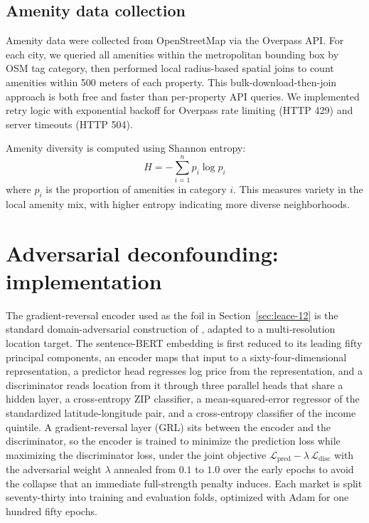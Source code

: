 \documentclass{article}
\begin{document}
\subsection{Amenity data collection}

Amenity data were collected from OpenStreetMap via the Overpass API. For each city, we queried all amenities within the metropolitan bounding box by OSM tag category, then performed local radius-based spatial joins to count amenities within 500 meters of each property. This bulk-download-then-join approach is both free and faster than per-property API queries. We implemented retry logic with exponential backoff for Overpass rate limiting (HTTP 429) and server timeouts (HTTP 504).

Amenity diversity is computed using Shannon entropy:
\begin{equation}
H = -\sum_{i=1}^n p_i \log p_i
\end{equation}
where $p_i$ is the proportion of amenities in category $i$. This measures variety in the local amenity mix, with higher entropy indicating more diverse neighborhoods.

\section{Adversarial deconfounding: implementation}
\label{app:adversarial}

The gradient-reversal encoder used as the foil in Section~\ref{sec:leace-12} is the
standard domain-adversarial construction of \citet{ganin2016domain}, adapted to a
multi-resolution location target. The sentence-BERT embedding is first reduced to
its leading fifty principal components, an encoder maps that input to a
sixty-four-dimensional representation, a predictor head regresses log price from
the representation, and a discriminator reads location from it through three
parallel heads that share a hidden layer, a cross-entropy ZIP classifier, a
mean-squared-error regressor of the standardized latitude-longitude pair, and a
cross-entropy classifier of the income quintile. A gradient-reversal layer (GRL) sits
between the encoder and the discriminator, so the encoder is trained to minimize
the prediction loss while maximizing the discriminator loss, under the joint
objective $\mathcal{L}_{\mathrm{pred}} - \lambda\,\mathcal{L}_{\mathrm{disc}}$ with
the adversarial weight $\lambda$ annealed from $0.1$ to $1.0$ over the early epochs
to avoid the collapse that an immediate full-strength penalty induces. Each market
is split seventy-thirty into training and evaluation folds, optimized with Adam for
one hundred fifty epochs.
\end{document}

